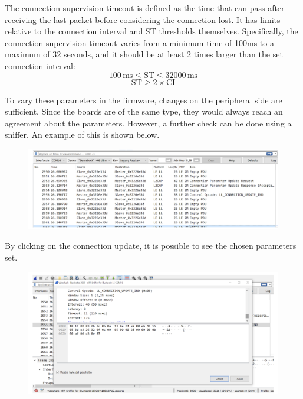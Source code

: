 \documentclass{Configuration_Files/PoliMi3i_thesis}
\begin{document}
The connection supervision timeout is defined as the time that can pass after receiving the last packet before considering the connection lost. It has limits relative to the connection interval and ST thresholds themselves. Specifically, the connection supervision timeout varies from a minimum time of 100ms to a maximum of 32 seconds, and it should be at least 2 times larger than the set connection interval:
\[
100\,\text{ms} \leq \text{ST} \leq 32000\,\text{ms}
\]
\[
\text{ST} \geq 2 \times \text{CI}
\]

To vary these parameters in the firmware, changes on the peripheral side are sufficient. Since the boards are of the same type, they would always reach an agreement about the parameters. However, a further check can be done using a sniffer. An example of this is shown below.

\begin{figure}[H]
    \centering
    \includegraphics[scale=0.3]{Test_Procedure/2.png}
    \label{fig:sniffed_connection_parameter_update}
\end{figure}

By clicking on the connection update, it is possible to see the chosen parameters set.

\begin{figure}[H]
    \centering
    \includegraphics{Test_Procedure/3.png}
    \label{fig:connection_parameters_wireshark}
\end{figure}
\end{document}
